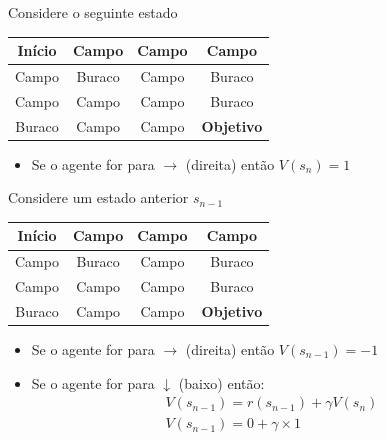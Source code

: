 \documentclass{beamer}
\begin{document}
\begin{frame}{Considere o seguinte estado}
	
	\begin{center}
		\begin{tabular}{ |c|c|c|c| } 
			\hline
			Início & Campo & Campo & Campo \\ 
			\hline
			Campo & \cellcolor{black!25} Buraco & Campo &  \cellcolor{black!25} Buraco\\ 
			\hline
			Campo & Campo & Campo & \cellcolor{black!25} Buraco\\ 
			\hline
			\cellcolor{black!25} Buraco & Campo & \cellcolor{red!25} Campo & \textbf{Objetivo} \\ 
			\hline
		\end{tabular}
	\end{center}
	
	\vspace{0.2cm}
	
	\begin{itemize}
		\item Se o agente for para $\rightarrow$ (direita) então $V(s_{n}) = 1$
	\end{itemize}
		
\end{frame}


\begin{frame}{Considere um estado anterior $s_{n-1}$}
	
	\begin{center}
		\begin{tabular}{ |c|c|c|c| } 
			\hline
			Início & Campo & Campo & Campo \\ 
			\hline
			Campo & \cellcolor{black!25} Buraco & Campo &  \cellcolor{black!25} Buraco\\ 
			\hline
			Campo & Campo & \cellcolor{red!25} Campo & \cellcolor{black!25} Buraco\\ 
			\hline
			\cellcolor{black!25} Buraco & Campo & Campo & \textbf{Objetivo} \\ 
			\hline
		\end{tabular}
	\end{center}
	
	\vspace{0.2cm}
	
	\begin{itemize}
		\item Se o agente for para $\rightarrow$ (direita) então $V(s_{n-1}) = -1$
		\item Se o agente for para $\downarrow$ (baixo) então:
		\begin{eqnarray}
		V(s_{n-1}) = r(s_{n-1}) + \gamma V(s_{n}) \\ \nonumber
		V(s_{n-1}) = 0 + \gamma \times 1 \nonumber
		\end{eqnarray}
	\end{itemize}
	
\end{frame}
\end{document}
